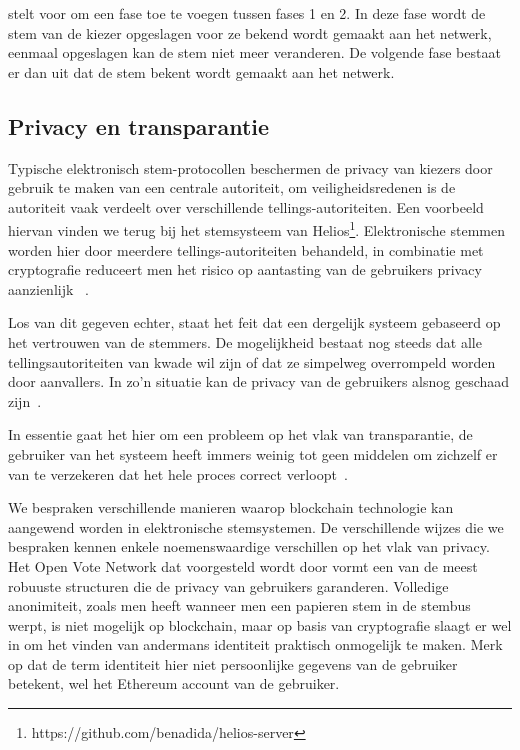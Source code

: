 			\textcite{McCorry2017} stelt voor om een fase toe te voegen tussen fases 1 en 2. In deze fase wordt de stem van de kiezer opgeslagen voor ze bekend wordt gemaakt aan het netwerk, eenmaal opgeslagen kan de stem niet meer veranderen. De volgende fase bestaat er dan uit dat de stem bekent wordt gemaakt aan het netwerk.
			
	\subsection{Privacy en transparantie}
		Typische elektronisch stem-protocollen beschermen de privacy van kiezers door gebruik te maken van een centrale autoriteit, om veiligheidsredenen is de autoriteit vaak verdeelt over verschillende tellings-autoriteiten. Een voorbeeld hiervan vinden we terug bij het stemsysteem van Helios\footnote{https://github.com/benadida/helios-server}. Elektronische stemmen worden hier door meerdere tellings-autoriteiten behandeld, in combinatie met cryptografie reduceert men het risico op aantasting van de gebruikers privacy aanzienlijk ~\autocite{Adida2008}. 
	
		Los van dit gegeven echter, staat het feit dat een dergelijk systeem gebaseerd op het vertrouwen van de stemmers. De mogelijkheid bestaat nog steeds dat alle tellingsautoriteiten van kwade wil zijn of dat ze simpelweg overrompeld worden door aanvallers. In zo’n situatie kan de privacy van de gebruikers alsnog geschaad zijn~\autocite{McCorry2017}.
		
		In essentie gaat het hier om een probleem op het vlak van transparantie, de gebruiker van het systeem heeft immers weinig tot geen middelen om zichzelf er van te verzekeren dat het hele proces correct verloopt~\autocite{McCorry2017}. 
		
		We bespraken verschillende manieren waarop blockchain technologie kan aangewend worden in elektronische stemsystemen. De verschillende wijzes die we bespraken kennen enkele noemenswaardige verschillen op het vlak van privacy. Het Open Vote Network dat voorgesteld wordt door \textcite{McCorry2017} vormt een van de meest robuuste structuren die de privacy van gebruikers garanderen. Volledige anonimiteit, zoals men heeft wanneer men een papieren stem in de stembus werpt, is niet mogelijk op blockchain, maar op basis van cryptografie slaagt \textcite{McCorry2017} er wel in om het vinden van andermans identiteit praktisch onmogelijk te maken. Merk op dat  de term identiteit hier niet persoonlijke gegevens van de gebruiker betekent, wel het Ethereum account van de gebruiker.
		
